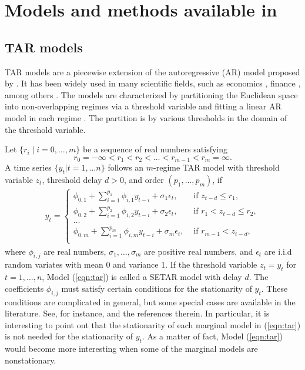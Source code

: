 \section{Models and methods available in } \label{sec:models}
\subsection{TAR models}
TAR models are a piecewise extension of the autoregressive (AR) model proposed by \cite{tong1978}. It has been widely used in many scientific fields, such as economics  \citep{tong1980,tiao1989}, finance \citep{domian1997,narayan2006}, among others \citep{chen1995a}.  The models are characterized by partitioning the Euclidean space into non-overlapping regimes
via a threshold variable and fitting a linear AR model in each regime \citep{li2016}. The
partition is by various thresholds in the domain of the threshold variable.

Let $\{ r_i \mid i=0,\ldots,m\}$ be a sequence of real numbers satisfying
\[
r_0=-\infty <r_1<r_2<\ldots <r_{m-1}<r_m=\infty.
\]
A time series $\{y_t| t=1,\ldots n\}$ follows an $m$-regime TAR model with threshold variable $z_t$, threshold delay $d>0$, and order $(p_1,\ldots,p_m)$, if
\begin{align}\label{eqn:tar}
y_t=
\begin{cases}
\phi_{0,1}+\sum_{i=1}^{p_1} \phi_{i,1}y_{t-i}+\sigma_1 \epsilon_t, &\mbox{ if } z_{t-d} \leq r_1,\\
\phi_{0,2}+\sum_{i=1}^{p_2} \phi_{i,2}y_{t-i}+\sigma_2 \epsilon_t, &\mbox{ if } r_1< z_{t-d} \leq r_2,\\
\ldots\\
\phi_{0,m}+\sum_{i=1}^{p_m} \phi_{i,m}y_{t-i}+\sigma_m \epsilon_t, &\mbox{ if } r_{m-1}<z_{t-d},\\
\end{cases}
\end{align}
where $\phi_{i,j}$ are real numbers, $\sigma_1,\ldots,\sigma_m$ are positive real numbers, and $\epsilon_t$ are i.i.d random variates with mean 0 and variance 1. If the threshold variable $z_t=y_t$ for $t=1,\ldots, n$, Model (\ref{eqn:tar}) is called a SETAR model with delay $d$. The coefficients $\phi_{i,j}$ must satisfy certain conditions for the
stationarity of  $y_t$. These conditions are complicated in general,
but some special cases are available in the
literature. See, for instance, \cite{chen1991} and the references therein. In particular, it is
interesting to point out that the stationarity of each marginal model in (\ref{eqn:tar}) is not
needed for the stationarity of $y_t$. As a matter of fact, Model (\ref{eqn:tar}) would
become more interesting when some of the marginal models are nonstationary.


